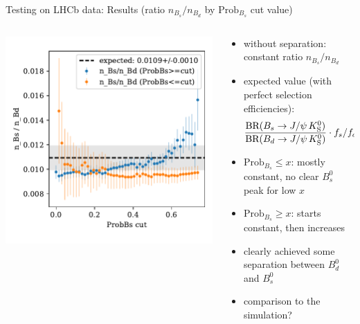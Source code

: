 \documentclass[aspectratio=1610, 10pt]{beamer}
\begin{document}
\begin{frame}{Testing on LHCb data: Results (ratio $n_{B_s}/n_{B_d}$ by $\text{Prob}_{B_s}$ cut value)}
  \begin{columns}
    \begin{column}{0.45\textwidth}
      \centering
      \includegraphics[width=\textwidth]{images/ratio_data.pdf}
    \end{column}
    \begin{column}{0.55\textwidth}
      \begin{itemize}
        \item without separation: constant ratio $n_{B_s}/n_{B_d}$
        \item expected value (with perfect selection efficiencies):
        \begin{equation*}
          \frac{\text{BR}(B_s \rightarrow J/\psi \, K^0_\text{S})}{\text{BR}(B_d \rightarrow J/\psi \, K^0_\text{S})} \cdot f_s/f_d(\qty{13}{\TeV}) = \num{0.0109\pm0.0010}
        \end{equation*}
        \pause
        \item $\text{Prob}_{B_s} \leq x$: mostly constant, no clear $B^0_s$ peak for low $x$
        \pause
        \item $\text{Prob}_{B_s} \geq x$: starts constant, then increases
        \pause 
        \item clearly achieved some separation between $B^0_d$ and $B^0_s$
        \item comparison to the simulation?
      \end{itemize}
    \end{column}
  \end{columns}
\end{frame}
\end{document}
